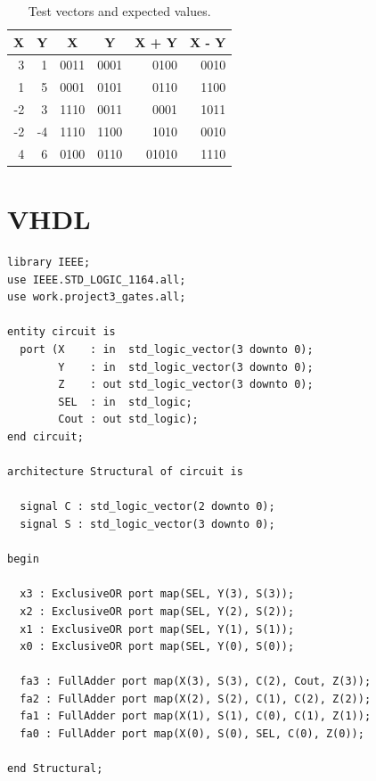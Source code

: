\documentclass{article}
\begin{document}
\begin{table}[hbtp]
  \centering
  \begin{tabular}{r|r|c|c|r|r}
    X  & Y  & X    & Y    & X + Y & X - Y \\
    \hline
    3  & 1  & 0011 & 0001 & 0100  & 0010  \\
    1  & 5  & 0001 & 0101 & 0110  & 1100  \\
    -2 & 3  & 1110 & 0011 & 0001  & 1011  \\
    -2 & -4 & 1110 & 1100 & 1010  & 0010  \\
    4  & 6  & 0100 & 0110 & 01010 & 1110  \\
\end{tabular}
  \caption{\label{tab:values}Test vectors and expected values.}
\end{table}

\section{VHDL}
\label{sec:vhdl}

\begin{verbatim}
library IEEE;
use IEEE.STD_LOGIC_1164.all;
use work.project3_gates.all;

entity circuit is
  port (X    : in  std_logic_vector(3 downto 0);
        Y    : in  std_logic_vector(3 downto 0);
        Z    : out std_logic_vector(3 downto 0);
        SEL  : in  std_logic;
        Cout : out std_logic);
end circuit;

architecture Structural of circuit is

  signal C : std_logic_vector(2 downto 0);
  signal S : std_logic_vector(3 downto 0);

begin

  x3 : ExclusiveOR port map(SEL, Y(3), S(3));
  x2 : ExclusiveOR port map(SEL, Y(2), S(2));
  x1 : ExclusiveOR port map(SEL, Y(1), S(1));
  x0 : ExclusiveOR port map(SEL, Y(0), S(0));

  fa3 : FullAdder port map(X(3), S(3), C(2), Cout, Z(3));
  fa2 : FullAdder port map(X(2), S(2), C(1), C(2), Z(2));
  fa1 : FullAdder port map(X(1), S(1), C(0), C(1), Z(1));
  fa0 : FullAdder port map(X(0), S(0), SEL, C(0), Z(0));

end Structural;
\end{verbatim}
\end{document}
